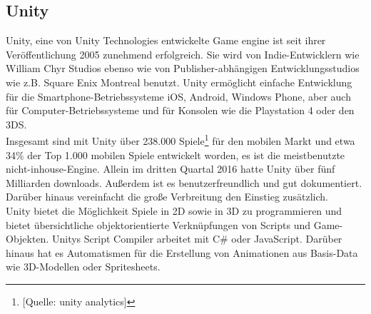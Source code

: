 \documentclass[extern,palatino]{cgBA}
\begin{document}
\subsection{Unity}
Unity, eine von Unity Technologies entwickelte Game engine ist seit ihrer Veröffentlichung 2005 zunehmend erfolgreich. %
Sie wird von Indie-Entwicklern wie William Chyr Studios ebenso wie von Publisher-abhängigen Entwicklungsstudios wie z.B. Square Enix Montreal benutzt. Unity ermöglicht einfache Entwicklung für die Smartphone-Betriebssysteme iOS, Android, Windows Phone, aber auch für Computer-Betriebssysteme und für Konsolen wie die Playstation 4 oder den 3DS.
\\Insgesamt sind mit Unity über 238.000 Spiele\footnote{[Quelle: unity analytics]} für den mobilen Markt %
und etwa 34\% der Top 1.000 mobilen Spiele entwickelt worden, es ist die meistbenutzte nicht-inhouse-Engine. Allein im dritten Quartal 2016 hatte Unity über fünf Milliarden downloads. Außerdem ist es benutzerfreundlich und gut dokumentiert. Darüber hinaus vereinfacht die große Verbreitung den Einstieg zusätzlich.
\\Unity bietet die Möglichkeit Spiele in 2D sowie in 3D zu programmieren und bietet übersichtliche objektorientierte Verknüpfungen von Scripts und Game-Objekten. Unitys Script Compiler arbeitet mit C\# oder JavaScript. Darüber hinaus hat es Automatismen für die Erstellung von Animationen aus Basis-Data wie 3D-Modellen oder Spritesheets. 
\newpage 
\end{document}
